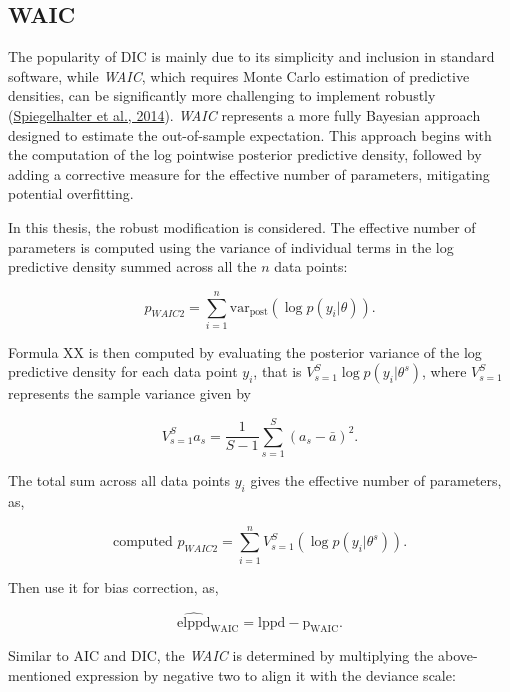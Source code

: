 \documentclass[
  11pt,
]{article}
\begin{document}
\subsection{WAIC}

The popularity of DIC is mainly due to its simplicity and inclusion in
standard software, while \emph{WAIC}, which requires Monte Carlo
estimation of predictive densities, can be significantly more
challenging to implement robustly
(\protect\hyperlink{ref-Spiegelhalter2014}{Spiegelhalter et al., 2014}).
\emph{WAIC} represents a more fully Bayesian approach designed to
estimate the out-of-sample expectation. This approach begins with the
computation of the log pointwise posterior predictive density, followed
by adding a corrective measure for the effective number of parameters,
mitigating potential overfitting.

In this thesis, the robust modification is considered. The effective
number of parameters is computed using the variance of individual terms
in the log predictive density summed across all the \(n\) data points:

\begin{equation}
p_{WAIC2} = \sum_{i=1}^{n} \text{var}_{\text{post}}(\log p(y_i|\theta)).
\end{equation}

Formula XX is then computed by evaluating the posterior variance of the
log predictive density for each data point \(y_i\), that is
\(V_{s=1}^{S}\log p(y_i|\theta^s)\), where \(V_{s=1}^S\) represents the
sample variance given by

\begin{equation}
V_{s=1}^{S}a_s = \frac{1}{S-1}\sum_{s=1}^{S} (a_s - \bar{a})^2.
\end{equation}

The total sum across all data points \(y_i\) gives the effective number
of parameters, as,

\begin{equation}
\text{computed } p_{WAIC2} = \sum_{i=1}^{n} V_{s=1}^{S} (\log p(y_i |\theta^s)).
\end{equation}

Then use it for bias correction, as,

\begin{equation}
\widehat{\text{elppd}}_{\text{WAIC}} = \text{lppd} - \text{p}_{\text{WAIC}}.
\end{equation}

Similar to AIC and DIC, the \emph{WAIC} is determined by multiplying the
above-mentioned expression by negative two to align it with the deviance
scale:
\end{document}
